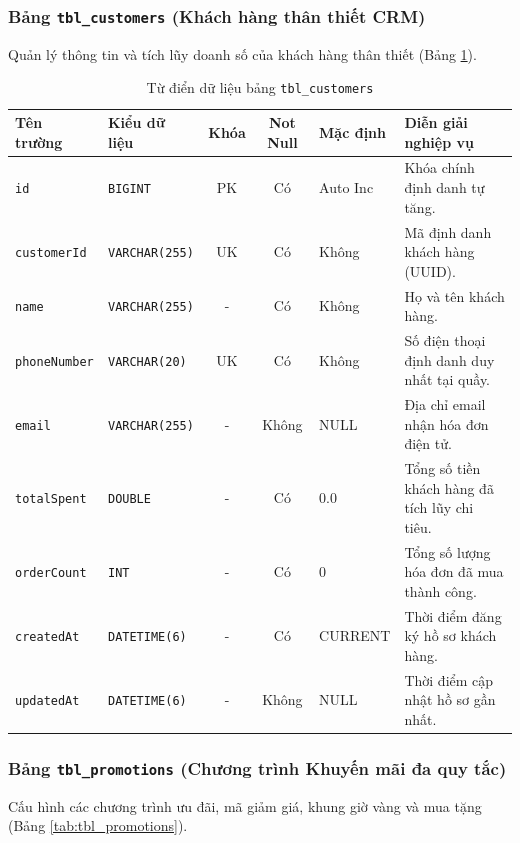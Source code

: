 \subsubsection{Bảng \texttt{tbl\_customers} (Khách hàng thân thiết CRM)}
Quản lý thông tin và tích lũy doanh số của khách hàng thân thiết (Bảng \ref{tab:tbl_customers}).

\begin{table}[htbp]
\centering
\caption{Từ điển dữ liệu bảng \texttt{tbl\_customers}}
\label{tab:tbl_customers}
\vspace{2mm}
\begin{tabularx}{\textwidth}{|p{2.5cm}|p{2.8cm}|c|c|p{1.8cm}|X|}
\hline
\textbf{Tên trường} & \textbf{Kiểu dữ liệu} & \textbf{Khóa} & \textbf{Not Null} & \textbf{Mặc định} & \textbf{Diễn giải nghiệp vụ} \\ \hline
\texttt{id} & \texttt{BIGINT} & PK & Có & Auto Inc & Khóa chính định danh tự tăng. \\ \hline
\texttt{customerId} & \texttt{VARCHAR(255)} & UK & Có & Không & Mã định danh khách hàng (UUID). \\ \hline
\texttt{name} & \texttt{VARCHAR(255)} & - & Có & Không & Họ và tên khách hàng. \\ \hline
\texttt{phoneNumber} & \texttt{VARCHAR(20)} & UK & Có & Không & Số điện thoại định danh duy nhất tại quầy. \\ \hline
\texttt{email} & \texttt{VARCHAR(255)} & - & Không & NULL & Địa chỉ email nhận hóa đơn điện tử. \\ \hline
\texttt{totalSpent} & \texttt{DOUBLE} & - & Có & 0.0 & Tổng số tiền khách hàng đã tích lũy chi tiêu. \\ \hline
\texttt{orderCount} & \texttt{INT} & - & Có & 0 & Tổng số lượng hóa đơn đã mua thành công. \\ \hline
\texttt{createdAt} & \texttt{DATETIME(6)} & - & Có & CURRENT & Thời điểm đăng ký hồ sơ khách hàng. \\ \hline
\texttt{updatedAt} & \texttt{DATETIME(6)} & - & Không & NULL & Thời điểm cập nhật hồ sơ gần nhất. \\ \hline
\end{tabularx}
\end{table}

\subsubsection{Bảng \texttt{tbl\_promotions} (Chương trình Khuyến mãi đa quy tắc)}
Cấu hình các chương trình ưu đãi, mã giảm giá, khung giờ vàng và mua tặng (Bảng \ref{tab:tbl_promotions}).

